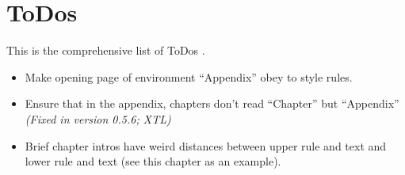 \section{ToDos}

This is the comprehensive list of ToDos .

\begin{itemize}
    \item Make opening page of environment ``Appendix'' obey to style rules.
    \item Ensure that in the appendix, chapters don't read ``Chapter'' but ``Appendix'' \textsl{(Fixed in version 0.5.6; XTL)}
    \item Brief chapter intros have weird distances between upper rule and text and lower rule and text (see this chapter as an example).
\end{itemize}

